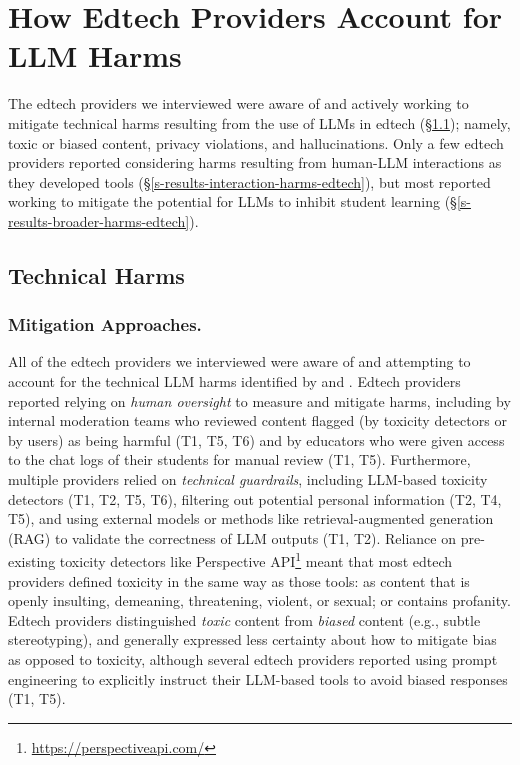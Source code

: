 \section{How Edtech Providers Account for LLM Harms}\label{s-results-edtech}

The edtech providers we interviewed were aware of and actively working to mitigate technical harms resulting from the use of LLMs in edtech (\S\ref{s-results-technical-harms-edtech}); namely, toxic or biased content, privacy violations, and hallucinations. Only a few edtech providers reported considering harms resulting from human-LLM interactions as they developed tools (\S\ref{s-results-interaction-harms-edtech}), but most reported working to mitigate the potential for LLMs to inhibit student learning (\S\ref{s-results-broader-harms-edtech}). 

\subsection{Technical Harms}\label{s-results-technical-harms-edtech}
\subsubsection*{Mitigation Approaches.} All of the edtech providers we interviewed were aware of and attempting to account for the technical LLM harms identified by \citet{bender_dangers_2021} and \citet{weidinger_taxonomy_2022}. Edtech providers reported relying on \textit{human oversight} to measure and mitigate harms, including by internal moderation teams who reviewed content flagged (by toxicity detectors or by users) as being harmful (T1, T5, T6) and by educators who were given access to the chat logs of their students for manual review (T1, T5). Furthermore, multiple providers relied on \textit{technical guardrails}, including LLM-based toxicity detectors (T1, T2, T5, T6), filtering out potential personal information (T2, T4, T5), and using external models or methods like retrieval-augmented generation (RAG) \cite{NEURIPS2020_6b493230} to validate the correctness of LLM outputs (T1, T2). Reliance on pre-existing toxicity detectors like Perspective API\footnote{\url{https://perspectiveapi.com/}} meant that most edtech providers defined toxicity in the same way as those tools: as content that is openly insulting, demeaning, threatening, violent, or sexual; or contains profanity. Edtech providers distinguished \textit{toxic} content from \textit{biased} content (e.g., subtle stereotyping), and generally expressed less certainty about how to mitigate bias as opposed to toxicity, although several edtech providers reported using prompt engineering to explicitly instruct their LLM-based tools to avoid biased responses (T1, T5).  

